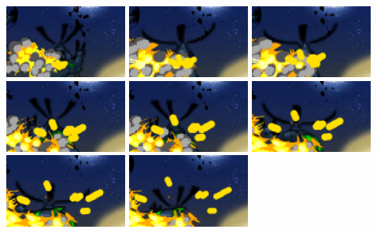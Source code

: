 \documentclass[10pt]{book}
\begin{document}
\begin{center}
\includegraphics[width=0.3\textwidth]{ns-lines-0000.png}
\includegraphics[width=0.3\textwidth]{ns-lines-0001.png}
\includegraphics[width=0.3\textwidth]{ns-lines-0002.png}
\includegraphics[width=0.3\textwidth]{ns-lines-0003.png}
\includegraphics[width=0.3\textwidth]{ns-lines-0004.png}
\includegraphics[width=0.3\textwidth]{ns-lines-0005.png}
\includegraphics[width=0.3\textwidth]{ns-lines-0006.png}
\includegraphics[width=0.3\textwidth]{ns-lines-0007.png}

\end{center}
\end{document}
